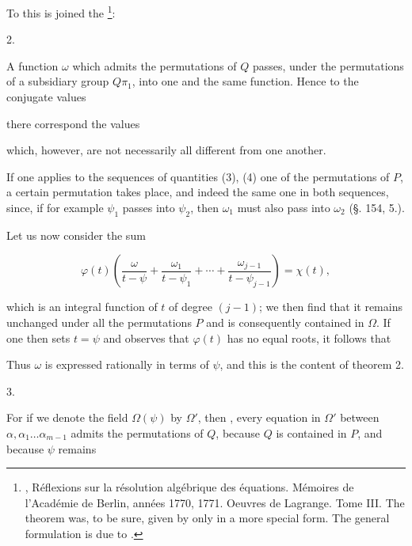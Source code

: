 
To this is joined the \footnote{, Réflexions sur la résolution algébrique des équations. Mémoires de l'Académie de Berlin, années 1770, 1771. Oeuvres de Lagrange. Tome III. The theorem was, to be sure, given by  only in a more special form. The general formulation is due to .}:

2. 

A function $\omega$ which admits the permutations of $Q$ passes,
under the permutations of a subsidiary group $Q\pi_1$, into one and
the same function. Hence to the conjugate
values


there correspond the values


which, however, are not necessarily all different from one another.

If one applies to the sequences of quantities (3), (4) one of the
permutations of $P$, a certain permutation takes place, and
indeed the same one in both sequences, since, if for example $\psi_1$ passes into $\psi_2$,
then $\omega_1$ must also pass into $\omega_2$ (§. 154, 5.).

Let us now consider the sum

\[
\varphi(t) \left( \frac{\omega}{t - \psi} + \frac{\omega_1}{t - \psi_1} + \cdots + \frac{\omega_{j-1}}{t - \psi_{j-1}} \right) = \chi(t),
\]

which is an integral function of $t$ of degree $(j-1)$; we then find
that it remains unchanged under all the permutations $P$ and
is consequently contained in $\Omega$. If one then sets $t = \psi$ and observes
that $\varphi(t)$ has no equal roots, it follows that


Thus $\omega$ is expressed rationally in terms of $\psi$, and this is the
content of theorem 2.

3. 

For if we denote the field $\Omega(\psi)$ by $\Omega'$, then ,
every equation in $\Omega'$ between $\alpha, \alpha_1 \ldots \alpha_{m-1}$ admits the permutations
of $Q$, because $Q$ is contained in $P$, and because $\psi$ remains
